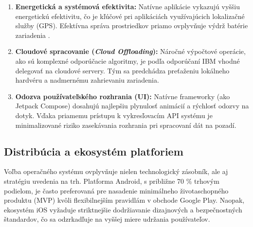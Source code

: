 \begin{enumerate}
    \item \textbf{Energetická a systémová efektivita:} Natívne aplikácie vykazujú vyššiu energetickú efektivitu, čo je kľúčové pri aplikáciách využívajúcich lokalizačné služby (GPS). Efektívna správa prostriedkov priamo ovplyvňuje výdrž batérie zariadenia \cite{pullur_medium_2025}.
    \item \textbf{Cloudové spracovanie (\textit{Cloud Offloading}):} Náročné výpočtové operácie, ako sú komplexné odporúčacie algoritmy, je podľa odporúčaní IBM vhodné delegovať na cloudové servery. Tým sa predchádza preťaženiu lokálneho hardvéru a nadmernému zahrievaniu zariadenia.
    \item \textbf{Odozva používateľského rozhrania (UI):} Natívne frameworky (ako Jetpack Compose) dosahujú najlepšiu plynulosť animácií a rýchlosť odozvy na dotyk. Vďaka priamemu prístupu k vykresľovacím API systému je minimalizované riziko zasekávania rozhrania pri spracovaní dát na pozadí.
\end{enumerate}

\subsection{Distribúcia a ekosystém platforiem}
Voľba operačného systému ovplyvňuje nielen technologický zásobník, ale aj stratégiu uvedenia na trh. Platforma Android, s približne 70 \% trhovým podielom, je často preferovaná pre nasadenie minimálneho životaschopného produktu (MVP) kvôli flexibilnejším pravidlám v obchode Google Play. Naopak, ekosystém iOS vyžaduje striktnejšie dodržiavanie dizajnových a bezpečnostných štandardov, čo sa odzrkadľuje na vyššej miere udržania používateľov.

